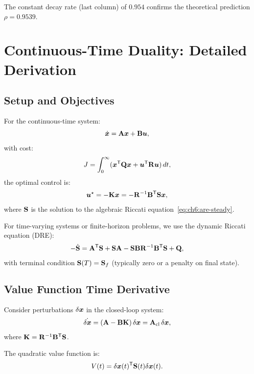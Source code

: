 The constant decay rate (last column) of $0.954$ confirms the theoretical prediction $\rho = 0.9539$.

\section{Continuous-Time Duality: Detailed Derivation}

\subsection{Setup and Objectives}

For the continuous-time system:
\begin{equation}
\dot{\bm{x}} = \mathbf{A}\bm{x} + \mathbf{B}\bm{u},
\label{eq:ch6:ct-system}
\end{equation}
with cost:
\begin{equation}
J = \int_0^\infty (\bm{x}^{\mathsf{T}}\mathbf{Q}\bm{x} + \bm{u}^{\mathsf{T}}\mathbf{R}\bm{u}) \, dt,
\label{eq:ch6:ct-cost}
\end{equation}
the optimal control is:
\begin{equation}
\bm{u}^\star = -\mathbf{K}\bm{x} = -\mathbf{R}^{-1}\mathbf{B}^{\mathsf{T}}\mathbf{S}\bm{x},
\label{eq:ch6:ct-optimal-control}
\end{equation}
where $\mathbf{S}$ is the solution to the algebraic Riccati equation~\eqref{eq:ch6:are-steady}.

For time-varying systems or finite-horizon problems, we use the dynamic Riccati equation (DRE):
\begin{equation}
-\dot{\mathbf{S}} = \mathbf{A}^{\mathsf{T}}\mathbf{S} + \mathbf{S}\mathbf{A} - \mathbf{S}\mathbf{B}\mathbf{R}^{-1}\mathbf{B}^{\mathsf{T}}\mathbf{S} + \mathbf{Q},
\label{eq:ch6:DRE-explicit}
\end{equation}
with terminal condition $\mathbf{S}(T) = \mathbf{S}_f$ (typically zero or a penalty on final state).

\subsection{Value Function Time Derivative}

Consider perturbations $\delta\bm{x}$ in the closed-loop system:
\begin{equation}
\dot{\delta\bm{x}} = (\mathbf{A} - \mathbf{B}\mathbf{K})\,\delta\bm{x} = \mathbf{A}_{\text{cl}}\,\delta\bm{x},
\label{eq:ch6:ct-closed-loop}
\end{equation}
where $\mathbf{K} = \mathbf{R}^{-1}\mathbf{B}^{\mathsf{T}}\mathbf{S}$.

The quadratic value function is:
\begin{equation}
V(t) = \delta\bm{x}(t)^{\mathsf{T}}\mathbf{S}(t)\delta\bm{x}(t).
\label{eq:ch6:ct-value}
\end{equation}

